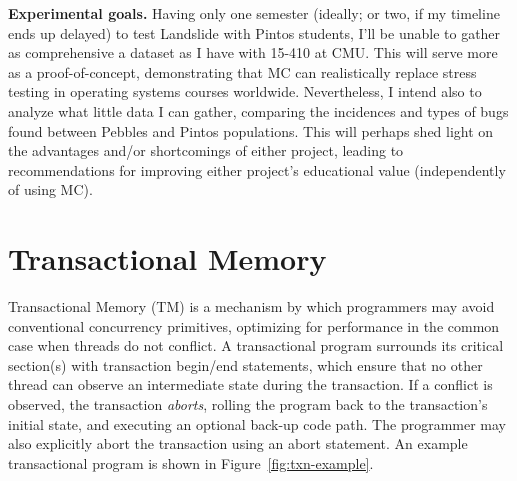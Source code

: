 {\bf Experimental goals.}
Having only one semester (ideally; or two, if my timeline ends up delayed) to test Landslide with Pintos students,
I'll be unable to gather as comprehensive a dataset as I have with 15-410 at CMU.
This will serve more as a proof-of-concept, demonstrating that MC can realistically replace stress testing in operating systems courses worldwide.
Nevertheless, I intend also to analyze what little data I can gather, comparing the incidences and types of bugs found between Pebbles and Pintos populations.
This will perhaps shed light on the advantages and/or shortcomings of either project,
leading to recommendations for improving either project's educational value (independently of using MC).


\section{Transactional Memory}

Transactional Memory (TM) is a mechanism by which programmers may avoid conventional concurrency primitives, optimizing for performance in the common case when threads do not conflict.
A transactional program surrounds its critical section(s) with transaction begin/end statements, which ensure that no other thread can observe an intermediate state during the transaction.
If a conflict is observed, the transaction {\em aborts}, rolling the program back to the transaction's initial state, and executing an optional back-up code path.
The programmer may also explicitly abort the transaction using an abort statement.
An example transactional program is shown in Figure~\ref{fig:txn-example}.

